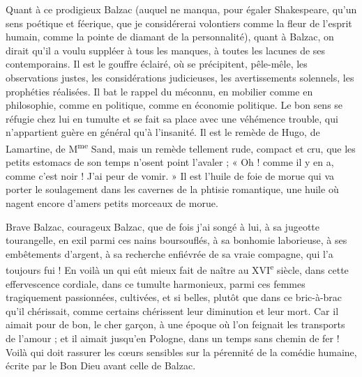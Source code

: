 \documentclass[french,twoside]{book} %
\begin{document}
Quant à ce prodigieux Balzac (auquel ne manqua, pour égaler Shakespeare, qu’un sens poétique et féerique, que je considérerai volontiers comme la fleur de l’esprit humain, comme la pointe de diamant de la personnalité), quant à Balzac, on dirait qu’il a voulu suppléer à tous les manques, à toutes les lacunes de ses contemporains. Il est le gouffre éclairé, où se précipitent, pêle-mêle, les observations justes, les considérations judicieuses, les avertissements solennels, les prophéties réalisées. Il bat le rappel du méconnu, en mobilier comme en philosophie, comme en politique, comme en économie politique. Le bon sens se réfugie chez lui en tumulte et se fait sa place avec une véhémence trouble, qui n’appartient guère en général qu’à l’insanité. Il est le remède de Hugo, de Lamartine, de M\textsuperscript{me} Sand, mais un remède tellement rude, compact et cru, que les petits estomacs de son temps n’osent point l’avaler ; « Oh ! comme il y en a, comme c’est noir ! J’ai peur de vomir. » Il est l’huile de foie de morue qui va porter le soulagement dans les cavernes de la phtisie romantique, une huile où nagent encore d’amers petits morceaux de morue.\par
Brave Balzac, courageux Balzac, que de fois j’ai songé à lui, à sa jugeotte tourangelle, en exil parmi ces nains boursouflés, à sa bonhomie laborieuse, à ses embêtements d’argent, à sa recherche enfiévrée de sa vraie compagne, qui l’a toujours fui ! En voilà un qui eût mieux fait de naître au XVI\textsuperscript{e} siècle, dans cette effervescence cordiale, dans ce tumulte harmonieux, parmi ces femmes tragiquement passionnées, cultivées, et si belles, plutôt que dans ce bric-à-brac qu’il chérissait, comme certains chérissent leur diminution et leur mort. Car il aimait pour de bon, le cher garçon, à une époque où l’on feignait les transports de l’amour ; et il aimait jusqu’en Pologne, dans un temps sans chemin de fer ! Voilà qui doit rassurer les cœurs sensibles sur la pérennité de la comédie humaine, écrite par le Bon Dieu avant celle de Balzac.\par
\end{document}
